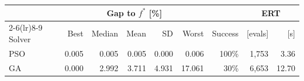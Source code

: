 \begin{tabular}{lrrrrrrrr}
\toprule
 & \multicolumn{5}{c}{Gap to $f^*$ [\%]} & & \multicolumn{2}{c}{ERT} \\
\cmidrule(lr){2-6}\cmidrule(lr){8-9}
Solver & Best & Median & Mean & SD & Worst & Success & [evals] & [s]\\
\midrule
PSO & 0.005 & 0.005 & 0.005 & 0.000 & 0.006 & 100\% & 1,753 & 3.36\\
GA & 0.000 & 2.992 & 3.711 & 4.931 & 17.061 & 30\% & 6,653 & 12.70\\
\bottomrule
\end{tabular}
